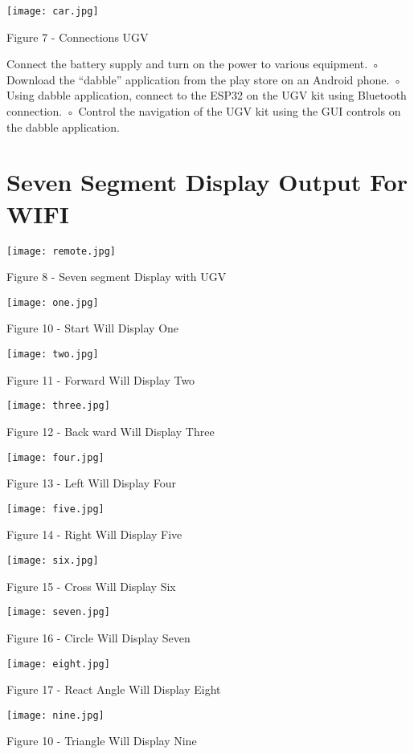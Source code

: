\documentclass[journal,12pt,twocolumn]{IEEEtran}
\begin{document}
\texttt{[image: car.jpg]}
\centerline{Figure 7 -  Connections UGV }
Connect the battery supply and turn on the power to various equipment.
◦ Download the “dabble” application from the play store on an Android phone.
◦ Using dabble application, connect to the ESP32 on the UGV kit using Bluetooth connection.
◦ Control the navigation of the UGV kit using the GUI controls on the dabble application.


\section{Seven Segment Display Output For WIFI}
\texttt{[image: remote.jpg]}
\centerline{Figure 8 -   Seven segment Display with UGV }
\texttt{[image: one.jpg]}
\centerline{Figure 10 -  Start Will Display One }
\texttt{[image: two.jpg]}
\centerline{Figure 11 -  Forward Will Display Two }
\texttt{[image: three.jpg]}
\centerline{Figure 12 -  Back ward Will Display Three }
\texttt{[image: four.jpg]}
\centerline{Figure 13 -  Left Will Display Four }
\texttt{[image: five.jpg]}
\centerline{Figure 14 -  Right Will Display Five }
\texttt{[image: six.jpg]}
\centerline{Figure 15 -  Cross Will Display Six }
\texttt{[image: seven.jpg]}
\centerline{Figure 16 -  Circle Will Display Seven }
\texttt{[image: eight.jpg]}
\centerline{Figure 17 -  React Angle Will Display Eight }
\texttt{[image: nine.jpg]}
\centerline{Figure 10 -  Triangle Will Display Nine }
\end{document}
